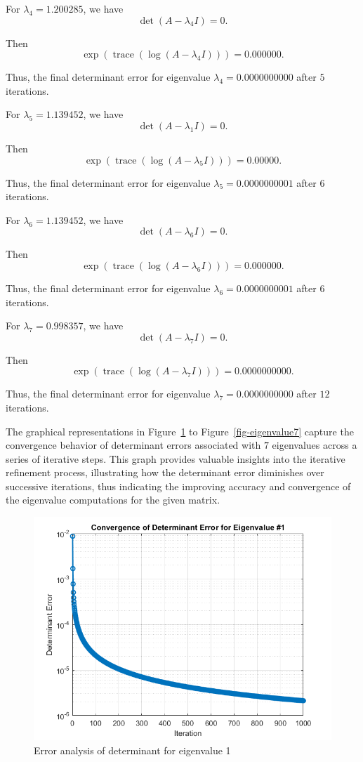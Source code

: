 \begin{example}
For $\lambda_4 = 1.200285$, we have $$\det(A - \lambda_4 I)= 0.$$

Then
$$\exp(\operatorname{trace}(\log (A -\lambda_4 I )))= 0.000000.$$ 

Thus, the final determinant error for eigenvalue $\lambda_4 = 0.0000000000$ after $5$ iterations.

For $\lambda_5 = 1.139452 $, we have 
   $$\det(A - \lambda_1 I)= 0.$$

Then $$\exp(\operatorname{trace}(\log (A -\lambda_5 I ))) = 0.00000.$$

Thus, the final determinant error for eigenvalue $\lambda_5 = 0.0000000001$ after $6$ iterations.

For $\lambda_6 = 1.139452 $, we have $$\det(A - \lambda_6 I)= 0.$$

Then
$$\exp(\operatorname{trace}(\log (A -\lambda_6 I )))= 0.000000.$$ 

Thus, the final determinant error for eigenvalue $\lambda_6 = 0.0000000001$ after $6$ iterations.

For $\lambda_7 = 0.998357 $, we have $$\det(A - \lambda_7 I)= 0.$$

Then
$$\exp(\operatorname{trace}(\log (A -\lambda_7 I )))= 0.0000000000.$$ 

Thus, the final determinant error for eigenvalue $\lambda_7 = 0.0000000000$ after $12$ iterations.



The graphical representations in Figure~\ref{fig-eigenvalue1} to Figure~\ref{fig-eigenvalue7} capture the convergence behavior of determinant errors associated with $7$ eigenvalues across a series of iterative steps.  This graph provides valuable insights into the iterative refinement process, illustrating how the determinant error diminishes over successive iterations, thus indicating the improving accuracy and convergence of the eigenvalue computations for the given matrix.

\begin{figure}[h]
    \centering
    \includegraphics[width=.79\linewidth]{Figures/eigen_1.png}
    \caption{Error analysis of determinant for eigenvalue 1 }
    \label{fig-eigenvalue1}
\end{figure}


\end{example}
